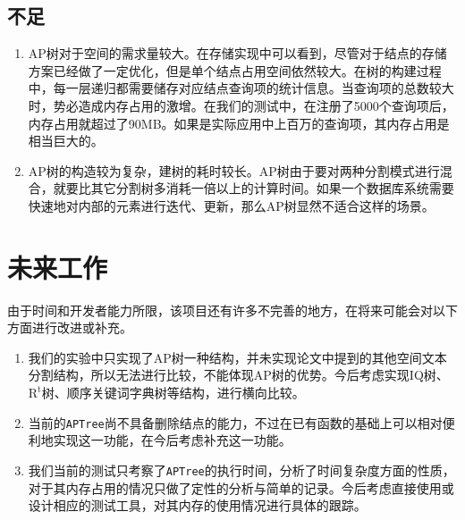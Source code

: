 \documentclass[UTF8]{ctexart}
\begin{document}
\subsection{不足}
\begin{enumerate}
    \item AP树对于空间的需求量较大。在存储实现中可以看到，尽管对于结点的存储方案已经做了一定优化，但是单个结点占用空间依然较大。在树的构建过程中，每一层递归都需要储存对应结点查询项的统计信息。当查询项的总数较大时，势必造成内存占用的激增。在我们的测试中，在注册了5000个查询项后，内存占用就超过了90MB。如果是实际应用中上百万的查询项，其内存占用是相当巨大的。
    \item AP树的构造较为复杂，建树的耗时较长。AP树由于要对两种分割模式进行混合，就要比其它分割树多消耗一倍以上的计算时间。如果一个数据库系统需要快速地对内部的元素进行迭代、更新，那么AP树显然不适合这样的场景。
\end{enumerate}

\section{未来工作}
由于时间和开发者能力所限，该项目还有许多不完善的地方，在将来可能会对以下方面进行改进或补充。
\begin{enumerate}
    \item 我们的实验中只实现了AP树一种结构，并未实现论文中提到的其他空间文本分割结构，所以无法进行比较，不能体现AP树的优势。今后考虑实现IQ树、$\mathrm{R^t}$树、顺序关键词字典树等结构，进行横向比较。
    \item 当前的\texttt{APTree}尚不具备删除结点的能力，不过在已有函数的基础上可以相对便利地实现这一功能，在今后考虑补充这一功能。
    \item 我们当前的测试只考察了\texttt{APTree}的执行时间，分析了时间复杂度方面的性质，对于其内存占用的情况只做了定性的分析与简单的记录。今后考虑直接使用或设计相应的测试工具，对其内存的使用情况进行具体的跟踪。
\end{enumerate}

\newpage
\end{document}
